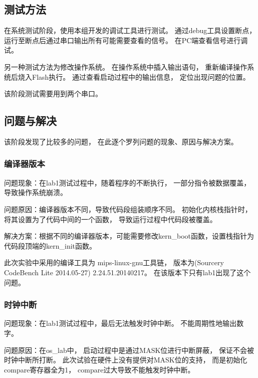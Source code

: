     \subsection{测试方法}
        在系统测试阶段，使用本组开发的调试工具进行测试。%
        通过debug工具设置断点，%
        运行至断点后通过串口输出所有可能需要查看的信号。%
        在PC端查看信号进行调试。

        另一种测试方法为修改操作系统。%
        在操作系统中插入输出语句，%
        重新编译操作系统后烧入Flash执行。%
        通过查看启动过程中的输出信息，%
        定位出现问题的位置。%
        
        该阶段测试需要用到两个串口。

    \subsection{问题与解决}
        该阶段发现了比较多的问题，%
        在此逐个罗列问题的现象、原因与解决方案。%

        \subsubsection{编译器版本}
            问题现象：在lab1测试过程中，随着程序的不断执行，%
            一部分指令被数据覆盖，导致操作系统崩溃。

            问题原因：编译器版本不同，导致代码段组装顺序不同。%
            初始化内核栈指针时，将其设置为了代码中间的一个函数，%
            导致运行过程中代码段被覆盖。

            解决方案：根据不同的编译器版本，可能需要修改kern\_boot函数，设置栈指针为代码段顶端的kern\_init函数。

            此次实验中采用的编译工具为%
            mips-linux-gnu工具链，%
            版本为(Sourcery CodeBench Lite 2014.05-27)%
            2.24.51.20140217。%
            在该版本下只有lab1出现了这个问题。

        \subsubsection{时钟中断}
            问题现象：在lab1测试过程中，最后无法触发时钟中断。%
            不能周期性地输出数字。

            问题原因：在os\_lab中，%
            启动过程中是通过MASK位进行中断屏蔽，%
            保证不会被时钟中断所打断。%
            此次试验在硬件上没有提供对MASK位的支持，%
            而是初始化compare寄存器全为1，%
            compare过大导致不能触发时钟中断。

